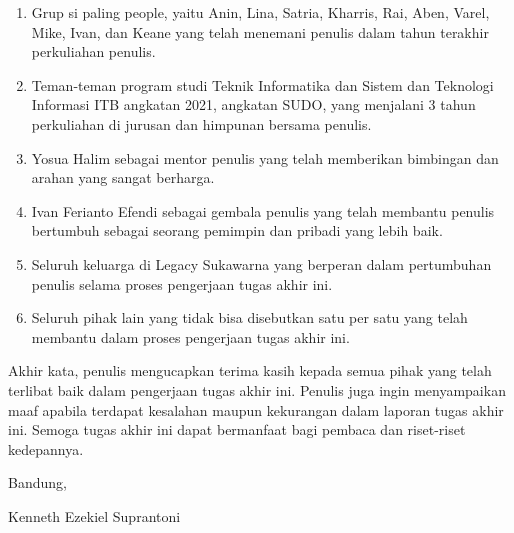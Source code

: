 \begin{enumerate}
	\item Grup si paling people, yaitu Anin, Lina, Satria, Kharris, Rai, Aben, Varel, Mike, Ivan, dan Keane yang telah menemani penulis dalam tahun terakhir perkuliahan penulis.
	\item Teman-teman program studi Teknik Informatika dan Sistem dan Teknologi Informasi ITB angkatan 2021, angkatan SUDO, yang menjalani 3 tahun perkuliahan di jurusan dan himpunan bersama penulis.
	\item Yosua Halim sebagai mentor penulis yang telah memberikan bimbingan dan arahan yang sangat berharga.
	\item Ivan Ferianto Efendi sebagai gembala penulis yang telah membantu penulis bertumbuh sebagai seorang pemimpin dan pribadi yang lebih baik.
	\item Seluruh keluarga di Legacy Sukawarna yang berperan dalam pertumbuhan penulis selama proses pengerjaan tugas akhir ini.
	\item Seluruh pihak lain yang tidak bisa disebutkan satu per satu yang telah membantu dalam proses pengerjaan tugas akhir ini.
\end{enumerate}

Akhir kata, penulis mengucapkan terima kasih kepada semua pihak yang telah terlibat baik dalam pengerjaan tugas akhir ini. Penulis juga ingin menyampaikan maaf apabila terdapat kesalahan maupun kekurangan dalam laporan tugas akhir ini. Semoga tugas akhir ini dapat bermanfaat bagi pembaca dan riset-riset kedepannya.


\begin{flushright}
	\vspace{0.5cm}
	Bandung, \tanggalpengesahan

	\vspace{1.5cm}

	Kenneth Ezekiel Suprantoni
\end{flushright}
